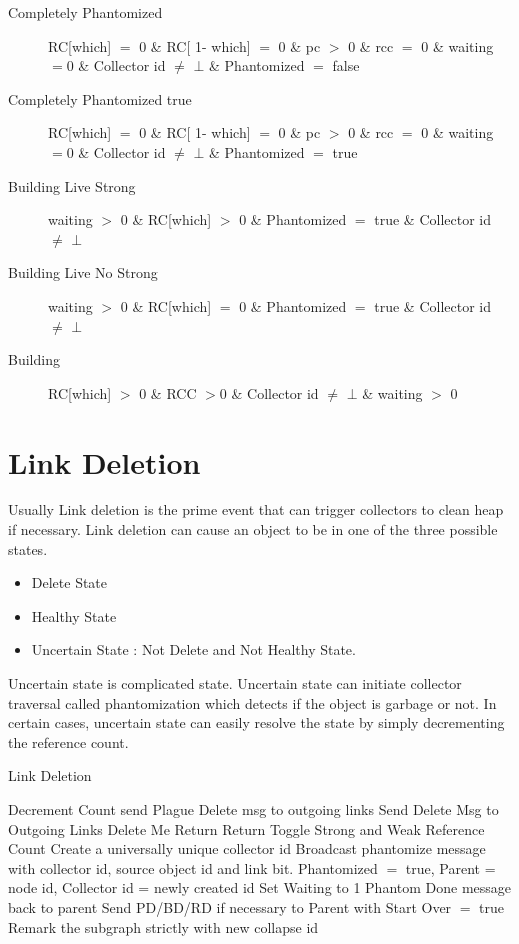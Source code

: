 \documentclass{article}
\begin{document}
\begin{description}
\item[Completely Phantomized] RC[which] $=$ 0 \& RC[ 1- which] $=$ 0 \& pc $>$ 0 \& rcc $=$ 0 \& waiting $=$0 \& Collector id $\neq$ $\bot$ \& Phantomized $=$ false
\item[Completely Phantomized true] RC[which] $=$ 0 \& RC[ 1- which] $=$ 0 \& pc $>$ 0 \& rcc $=$ 0 \& waiting $=$0 \& Collector id $\neq$ $\bot$ \& Phantomized $=$ true
\item[Building Live Strong] waiting $>$ 0 \& RC[which] $>$ 0 \& Phantomized $=$ true \& Collector id $\neq$ $\bot$
\item[Building Live No Strong] waiting $>$ 0 \& RC[which] $=$ 0 \& Phantomized $=$ true \& Collector id $\neq$ $\bot$
   \item[Building] RC[which] $>$ 0 \& RCC $>$0 \& Collector id $\neq$ $\bot$ \& waiting $>$ 0

\end{description}
\section{Link Deletion}
	Usually Link deletion is the prime event that can trigger collectors to clean heap if necessary. Link deletion can cause an object to be in one of the three possible states. 
\begin{itemize}
  \item Delete State
  \item Healthy State
  \item Uncertain State : Not Delete and Not Healthy State.
\end{itemize}
	Uncertain state is complicated state. Uncertain state can initiate collector traversal called phantomization which detects if the object is garbage or not. In certain cases, uncertain state can easily resolve the state by simply decrementing the reference count. 

\begin{algorithm}
\caption{Link Deletion}
\label{Link Deletion}
\begin{algorithmic}[1]
\State Decrement Count
\State send Plague Delete msg to outgoing links
\EndIf
{}
\State Send Delete Msg to Outgoing Links
\State Delete Me
\State Return
\State Return
\State Toggle Strong and Weak Reference Count
\State Create a universally unique collector id
\State Broadcast phantomize message with collector id, source object id and link bit.
\EndFor
\State Phantomized $=$ true, Parent = node id, Collector id = newly created id
\State Set Waiting to 1
\State Phantom Done message back to parent
\EndIf
{}
\State Send PD/BD/RD if necessary to Parent with Start Over $=$ true
\State Remark the subgraph strictly with new collapse id 
\EndIf
\EndProcedure
\end{algorithmic}
\end{algorithm}	
\end{document}
